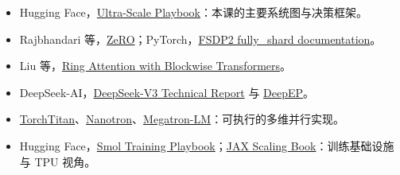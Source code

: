 \begin{itemize}
  \item Hugging Face，\href{https://huggingface.co/spaces/nanotron/ultrascale-playbook}{Ultra-Scale Playbook}：本课的主要系统图与决策框架。
  \item Rajbhandari 等，\href{https://arxiv.org/abs/1910.02054}{ZeRO}；PyTorch，\href{https://docs.pytorch.org/docs/stable/distributed.fsdp.fully_shard.html}{FSDP2 fully\_shard documentation}。
  \item Liu 等，\href{https://arxiv.org/abs/2310.01889}{Ring Attention with Blockwise Transformers}。
  \item DeepSeek-AI，\href{https://arxiv.org/abs/2412.19437}{DeepSeek-V3 Technical Report} 与 \href{https://github.com/deepseek-ai/DeepEP}{DeepEP}。
  \item \href{https://github.com/pytorch/torchtitan}{TorchTitan}、\href{https://github.com/huggingface/nanotron}{Nanotron}、\href{https://github.com/NVIDIA/Megatron-LM}{Megatron-LM}：可执行的多维并行实现。
  \item Hugging Face，\href{https://huggingface.co/spaces/HuggingFaceTB/smol-training-playbook}{Smol Training Playbook}；\href{https://jax-ml.github.io/scaling-book/tpus/}{JAX Scaling Book}：训练基础设施与 TPU 视角。
\end{itemize}


